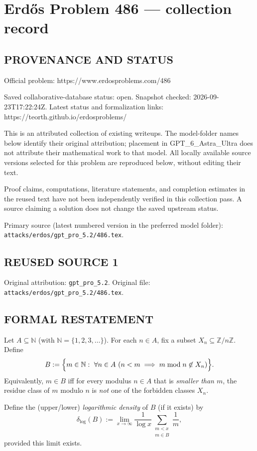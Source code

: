 \section*{Erd\H{o}s Problem 486 --- collection record}

\subsection*{PROVENANCE AND STATUS}
Official problem: https://www.erdosproblems.com/486

Saved collaborative-database status: open.
Snapshot checked: 2026-09-23T17:22:24Z.
Latest status and formalization links: https://teorth.github.io/erdosproblems/

This is an attributed collection of existing writeups. The model-folder names below identify their original attribution; placement in GPT\_6\_Astra\_Ultra does not attribute their mathematical work to that model. All locally available source versions selected for this problem are reproduced below, without editing their text.

Proof claims, computations, literature statements, and completion estimates in the reused text have not been independently verified in this collection pass. A source claiming a solution does not change the saved upstream status.

Primary source (latest numbered version in the preferred model folder): \texttt{attacks/erdos/gpt\_pro\_5.2/486.tex}.

\subsection*{REUSED SOURCE 1}
Original attribution: \texttt{gpt\_pro\_5.2}.
Original file: \texttt{attacks/erdos/gpt\_pro\_5.2/486.tex}.


\subsection*{FORMAL RESTATEMENT}
Let $A\subseteq\mathbb{N}$ (with $\mathbb{N}=\{1,2,3,\dots\}$). For each $n\in A$, fix a subset $X_n\subseteq \mathbb{Z}/n\mathbb{Z}$.
Define
\[
B := \Bigl\{ m\in\mathbb{N}:\ \forall n\in A\ (n<m\implies m\bmod n\not\in X_n)\Bigr\}.
\]
Equivalently, $m\in B$ iff for every modulus $n\in A$ that is \emph{smaller than $m$}, the residue class of $m$ modulo $n$ is \emph{not} one of the forbidden classes $X_n$.

Define the (upper/lower) \emph{logarithmic density} of $B$ (if it exists) by
\[
\delta_{\log}(B) := \lim_{x\to\infty}\frac{1}{\log x}\sum_{\substack{m<x\\m\in B}}\frac{1}{m},
\]
provided this limit exists.

